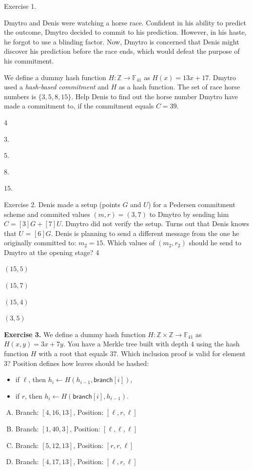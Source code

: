 \documentclass[../lecture-notes-148x210.tex]{subfiles}
\begin{document}
\vspace{-1mm}

\begin{xexercise}
    {Exercise 1.}
    {Dmytro and Denis were watching a horse race. Confident in
    his ability to predict the outcome, Dmytro decided to commit to his
    prediction. However, in his haste, he forgot to use a blinding factor. Now,
    Dmytro is concerned that Denis might discover his prediction before the race
    ends, which would defeat the purpose of his commitment.
    
    We define a dummy hash function $H: \mathbb{Z} \to \mathbb{F}_{41}$ as $H(x)
    = 13x+17$. Dmytro used a \textit{hash-based commitment} and $H$ as a hash
    function. The set of race horse numbers is $\{3, 5, 8, 15\}$. Help Denis to
    find out the horse number Dmytro have made a commitment to, if the
    commitment equals $C = 39$.}
    {4}
    {
        \item $3$.
        \item $5$.
        \item $8$.
        \item $15$.
    }
\end{xexercise}

\begin{xexercise}
    {Exercise 2.}
    {Denis made a setup (points $G$ and $U$) for a Pedersen
    commitment scheme and commited values $(m, r) = (3, 7)$ to Dmytro by sending him
    $C = [3]G + [7]U$. Dmytro did not verify the setup. Turns out that Denis knows
    that $U$ = $[6]G$. Denis is planning to send a different message from the one he
    originally committed to: $m_2 = 15$. Which values of $(m_2, r_2)$ should he send
    to Dmytro at the opening stage?}
    {4}
    {
        \item $(15, 5)$
        \item $(15, 7)$
        \item $(15, 4)$
        \item $(3, 5)$
    }
\end{xexercise}

\textbf{Exercise 3.} We define a dummy hash function $H: \mathbb{Z} \times
\mathbb{Z} \to \mathbb{F}_{41}$ as $H(x, y) = 3x+7y$. You have a Merkle tree
built with depth $4$ using the hash function $H$ with a root that equals $37$.
Which inclusion proof is valid for element $3$? Position defines how leaves
should be hashed:
\begin{itemize}
    \item if $\ell$, then $h_i \gets H(h_{i-1}, \mathsf{branch}[i])$,
    \item if $r$, then $h_i \gets H(\mathsf{branch}[i], h_{i-1})$.
\end{itemize}
\begin{enumerate}[(A)]
    \item Branch: $[4, 16, 13]$, Position: $[\ell,r,\ell]$
    \item Branch: $[1, 40, 3]$, Position: $[\ell, \ell, \ell]$
    \item Branch: $[5, 12, 13]$, Position: $[r, r, \ell]$
    \item Branch: $[4, 17, 13]$, Position: $[\ell, r, \ell]$
\end{enumerate}
\end{document}
